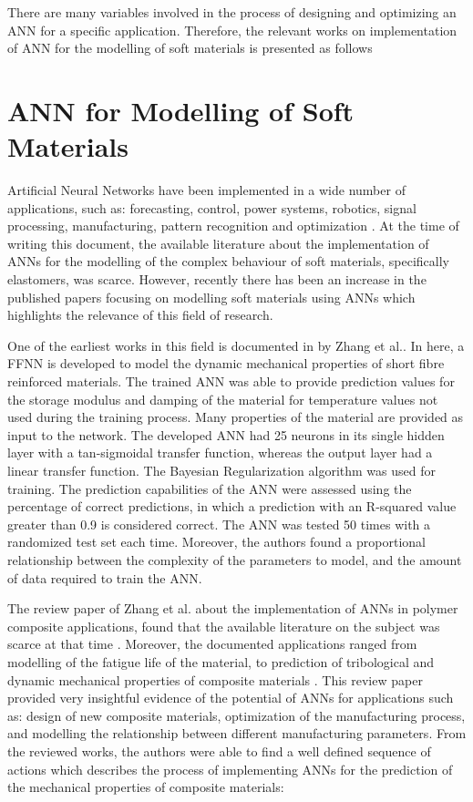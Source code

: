 There are many variables involved in the process of designing and optimizing an ANN for a specific application. Therefore, the relevant works on implementation of ANN for the modelling of soft materials is presented as follows

\section{ANN for Modelling of Soft Materials }

Artificial Neural Networks have been implemented in a wide number of applications, such as: forecasting, control, power systems, robotics, signal processing, manufacturing, pattern recognition and optimization \cite{khan2019fabrication}. At the time of writing this document, the available literature about the implementation of ANNs for the modelling of the complex behaviour of soft materials, specifically elastomers, was scarce. However, recently there has been an increase in the published papers focusing on modelling soft materials using ANNs which highlights the relevance of this field of research.

One of the earliest works in this field is documented in \cite{zhang2002dynamic} by Zhang et al.. In here, a FFNN is developed to model the dynamic mechanical properties of short fibre reinforced materials. The trained ANN was able to provide prediction values for the storage modulus and damping of the material for temperature values not used during the training process. Many properties of the material are provided as input to the network. The developed ANN had 25 neurons in its single hidden layer with a tan-sigmoidal transfer function, whereas the output layer had a linear transfer function. The Bayesian Regularization algorithm was used for training. The prediction capabilities of the ANN were assessed using the percentage of correct predictions, in which a prediction with an R-squared value greater than 0.9 is considered correct. The ANN was tested 50 times with a randomized test set each time. Moreover, the authors found a proportional relationship between the complexity of the parameters to model, and the amount of data required to train the ANN. 

The review paper of Zhang et al. about the implementation of ANNs in polymer composite applications, found that the available literature on the subject was scarce at that time \cite{zhang2003artificial}. Moreover, the documented applications ranged from modelling of the fatigue life of the material, to prediction of tribological and dynamic mechanical properties of composite materials \cite{zhang2002prediction,zhang2002dynamic}. This review paper provided very insightful evidence of the potential of ANNs for applications such as: design of new composite materials, optimization of the manufacturing process, and modelling the relationship between different manufacturing parameters. From the reviewed works, the authors were able to find a well defined sequence of actions which describes the process of implementing ANNs for the prediction of the mechanical properties of composite materials:

